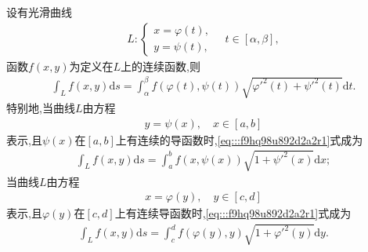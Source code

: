 \documentclass[../../main.tex]{subfiles}%
\begin{document}
\begin{theorem}[第一类曲线积分计算公式]\label{theorem:第一类曲线积分计算公式}
设有光滑曲线
\begin{align*}
L:\begin{cases} x = \varphi(t), \\ y = \psi(t), \end{cases} \quad t \in [\alpha,\beta],
\end{align*}
函数$f(x,y)$为定义在$L$上的连续函数,则
\begin{align}
\int_L f(x,y)\mathrm{d}s = \int_{\alpha}^{\beta} f(\varphi(t),\psi(t)) \sqrt{\varphi'^2(t) + \psi'^2(t)} \mathrm{d}t. \label{eq:::f9hq98u892d2a2r1}
\end{align}
特别地,当曲线$L$由方程
\begin{align*}
y = \psi(x), \quad x \in [a,b]
\end{align*}
表示,且$\psi(x)$在$[a,b]$上有连续的导函数时,\eqref{eq:::f9hq98u892d2a2r1}式成为
\begin{align*}
\int_L f(x,y)\mathrm{d}s = \int_{a}^{b} f(x,\psi(x)) \sqrt{1 + \psi'^2(x)} \mathrm{d}x;
\end{align*}
当曲线$L$由方程
\begin{align*}
x = \varphi(y), \quad y \in [c,d]
\end{align*}
表示,且$\varphi(y)$在$[c,d]$上有连续导函数时,\eqref{eq:::f9hq98u892d2a2r1}式成为
\begin{align*}
\int_L f(x,y)\mathrm{d}s = \int_{c}^{d} f(\varphi(y),y) \sqrt{1 + \varphi'^2(y)} \mathrm{d}y.
\end{align*}
\end{theorem}
\end{document}

